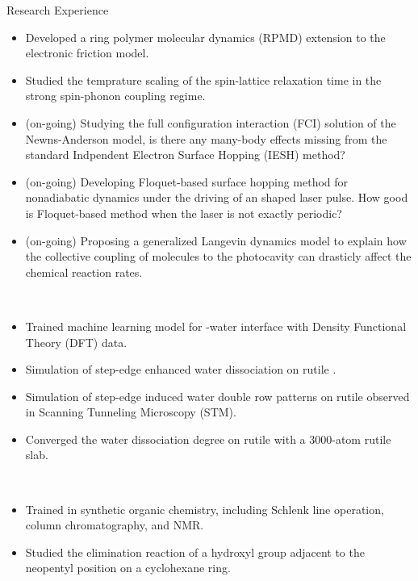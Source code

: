 \documentclass{resume}
\begin{document}
\begin{rSection}{Research Experience}
     \\
    \begin{itemize}[noitemsep, nosep]
        \item Developed a ring polymer molecular dynamics (RPMD) extension to the electronic friction model.
        \item Studied the temprature scaling of the spin-lattice relaxation time in the strong spin-phonon coupling regime.
        \item (on-going) Studying the full configuration interaction (FCI) solution of the Newns-Anderson model, is there any many-body effects missing from the standard Indpendent Electron Surface Hopping (IESH) method?
        \item (on-going) Developing Floquet-based surface hopping method for nonadiabatic dynamics under the driving of an shaped laser pulse. How good is Floquet-based method when the laser is not exactly periodic?
        \item (on-going) Proposing a generalized Langevin dynamics model to explain how the collective coupling of molecules to the photocavity can drasticly affect the chemical reaction rates.
    \end{itemize}

     \\
    \begin{itemize}[noitemsep, nosep]
        \item Trained machine learning model for -water interface with Density Functional Theory (DFT) data.   
        \item Simulation of step-edge enhanced water dissociation on rutile .
        \item Simulation of step-edge induced water double row patterns on rutile  observed in Scanning Tunneling Microscopy (STM).
        \item Converged the water dissociation degree on rutile  with a 3000-atom rutile slab.
    \end{itemize}

     \\
    \begin{itemize}[noitemsep, nosep]
        \item Trained in synthetic organic chemistry, including Schlenk line operation, column chromatography, and NMR. 
        \item Studied the elimination reaction of a hydroxyl group adjacent to the neopentyl position on a cyclohexane ring.
    \end{itemize}
\end{rSection}
\end{document}
